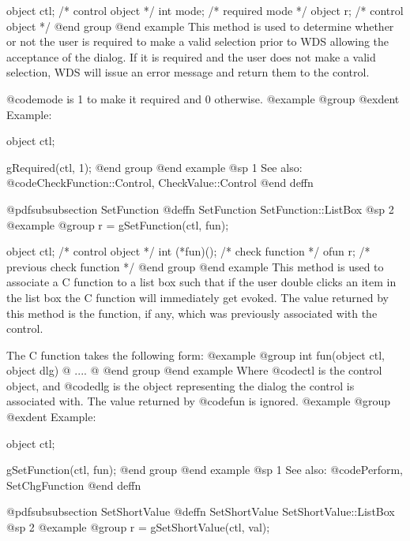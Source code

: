 object  ctl;    /*  control object  */
int     mode;   /*  required mode   */
object  r;      /*  control object  */
@end group
@end example
This method is used to determine whether or not the user is required to
make a valid selection prior to WDS allowing the acceptance of the dialog.
If it is required and the user does not make a valid selection, WDS
will issue an error message and return them to the control.

@code{mode} is 1 to make it required and 0 otherwise.
@example
@group
@exdent Example:

object  ctl;

gRequired(ctl, 1);
@end group
@end example
@sp 1
See also:  @code{CheckFunction::Control, CheckValue::Control}
@end deffn








@pdfsubsubsection {SetFunction}
@deffn {SetFunction} SetFunction::ListBox
@sp 2
@example
@group
r = gSetFunction(ctl, fun);

object  ctl;      /*  control object           */
int     (*fun)(); /*  check function           */
ofun    r;        /*  previous check function  */
@end group
@end example
This method is used to associate a C function to a list box such that if
the user double clicks an item in the list box the C function will
immediately get evoked.  The value returned by this method is the
function, if any, which was previously associated with the control.

The C function takes the following form:
@example
@group
int     fun(object ctl, object dlg)
@{
        ....
@}
@end group
@end example
Where @code{ctl} is the control object, and @code{dlg} is the object
representing the dialog the control is associated with.  The value
returned by @code{fun} is ignored.
@example
@group
@exdent Example:

object  ctl;

gSetFunction(ctl, fun);
@end group
@end example
@sp 1
See also:  @code{Perform, SetChgFunction}
@end deffn


















@pdfsubsubsection {SetShortValue}
@deffn {SetShortValue} SetShortValue::ListBox
@sp 2
@example
@group
r = gSetShortValue(ctl, val);

